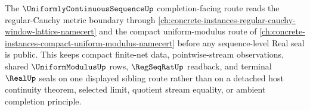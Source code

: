 The $\UniformlyContinuousSequenceUp$ completion-facing route reads the regular-Cauchy metric boundary through \autoref{ch:concrete-instances-regular-cauchy-window-lattice-namecert} and the compact uniform-modulus route of \autoref{ch:concrete-instances-compact-uniform-modulus-namecert} before any sequence-level Real seal is public. This keeps compact finite-net data, pointwise-stream observations, shared $\UniformModulusUp$ rows, $\RegSeqRatUp$ readback, and terminal $\RealUp$ seals on one displayed sibling route rather than on a detached host continuity theorem, selected limit, quotient stream equality, or ambient completion principle.
